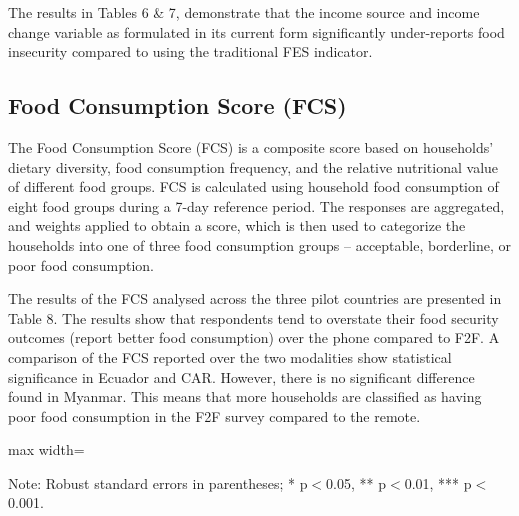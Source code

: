 \documentclass[11pt,harvard]{article}
\begin{document}
	
The results in Tables 6 \& 7, demonstrate that the income source and income change variable as formulated in its current form significantly under-reports food insecurity compared to using the traditional FES indicator.
	
	
\clearpage

\subsection{Food Consumption Score (FCS)}
	
The Food Consumption Score (FCS) is a composite score based on households’ dietary diversity, food consumption frequency, and the relative nutritional value of different food groups. FCS is calculated using household food consumption of eight food groups during a 7-day reference period. The responses are aggregated, and weights applied to obtain a score, which is then used to categorize the households into one of three food consumption groups – acceptable, borderline, or poor food consumption.

The results of the FCS analysed across the three pilot countries are presented in Table 8. The results show that respondents tend to overstate their food security outcomes (report better food consumption) over the phone compared to F2F. A comparison of the FCS reported over the two modalities show statistical significance in Ecuador and CAR. However, there is no significant difference found in Myanmar. This means that more households are classified as having poor food consumption in the F2F survey compared to the remote.

	
	\begin{table}[htbp]
		\centering
		\begin{adjustbox}{max width=\textwidth}
			\begin{threeparttable}
				\caption{Impact of Survey Modality on Food Consumption Score and Groups}
				\scriptsize
				 
				\label{tab:FCS_Modality_All_Country}
				\begin{tablenotes}
					\item Note: Robust standard errors in parentheses; * p$<$0.05, ** p$<$0.01, *** p$<$0.001. 
				\end{tablenotes}
			\end{threeparttable}
		\end{adjustbox}
	\end{table}
	
	\pagebreak
	
\end{document}
